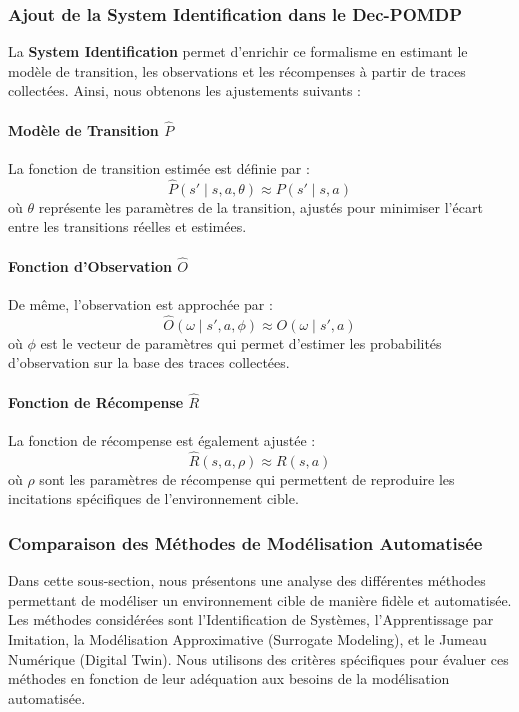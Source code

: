 \documentclass[sigconf,anonymous]{aamas}
\begin{document}
\subsubsection{Ajout de la System Identification dans le Dec-POMDP}

La \textbf{System Identification} permet d'enrichir ce formalisme en estimant le modèle de transition, les observations et les récompenses à partir de traces collectées. Ainsi, nous obtenons les ajustements suivants :

\paragraph{Modèle de Transition \(\hat{P}\)}
La fonction de transition estimée est définie par :
\[
\hat{P}(s' \mid s, a, \theta) \approx P(s' \mid s, a)
\]
où \(\theta\) représente les paramètres de la transition, ajustés pour minimiser l'écart entre les transitions réelles et estimées.

\paragraph{Fonction d'Observation \(\hat{O}\)}
De même, l'observation est approchée par :
\[
\hat{O}(\omega \mid s', a, \phi) \approx O(\omega \mid s', a)
\]
où \(\phi\) est le vecteur de paramètres qui permet d'estimer les probabilités d'observation sur la base des traces collectées.

\paragraph{Fonction de Récompense \(\hat{R}\)}
La fonction de récompense est également ajustée :
\[
\hat{R}(s, a, \rho) \approx R(s, a)
\]
où \(\rho\) sont les paramètres de récompense qui permettent de reproduire les incitations spécifiques de l'environnement cible.

\subsubsection{Comparaison des Méthodes de Modélisation Automatisée}

Dans cette sous-section, nous présentons une analyse des différentes méthodes permettant de modéliser un environnement cible de manière fidèle et automatisée. Les méthodes considérées sont l'Identification de Systèmes, l'Apprentissage par Imitation, la Modélisation Approximative (Surrogate Modeling), et le Jumeau Numérique (Digital Twin). Nous utilisons des critères spécifiques pour évaluer ces méthodes en fonction de leur adéquation aux besoins de la modélisation automatisée.
\end{document}

